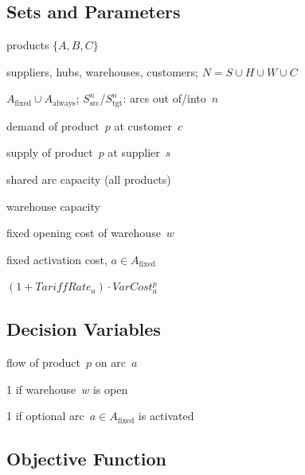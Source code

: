 
\subsection{Sets and Parameters}

\begin{description}[
  labelwidth=3.6em, leftmargin=4em,
  itemsep=1pt, parsep=0pt, topsep=3pt,
  font=\normalfont]
  \item[$P$]             products $\{A, B, C\}$
  \item[$S,H,W,C$]       suppliers, hubs, warehouses, customers; $N=S\cup H\cup W\cup C$
  \item[$A$]             $A_{\text{fixed}}\cup A_{\text{always}}$; $S_{\text{src}}^n$/$S_{\text{tgt}}^n$: arcs out of/into~$n$
  \item[$Dem_c^p$]       demand of product~$p$ at customer~$c$
  \item[$Sup_s^p$]       supply of product~$p$ at supplier~$s$
  \item[$CapArc_a$]      shared arc capacity (all products)
  \item[$CapWare_w$]     warehouse capacity
  \item[$OpenCost_w$]    fixed opening cost of warehouse~$w$
  \item[$FixAct_a$]      fixed activation cost, $a \in A_{\text{fixed}}$
  \item[$TotalCost_a^p$] $(1+TariffRate_a)\cdot VarCost_a^p$
\end{description}

\subsection{Decision Variables}

\begin{description}[
  labelwidth=4.4em, leftmargin=4.8em,
  itemsep=1pt, parsep=0pt, topsep=3pt,
  font=\normalfont]
  \item[$x_a^p \geq 0$]              flow of product~$p$ on arc~$a$
  \item[$y_w \in \{0,1\}$]           1 if warehouse~$w$ is open
  \item[$z_a \in \{0,1\}$]           1 if optional arc~$a \in A_{\text{fixed}}$ is activated
\end{description}

\subsection{Objective Function}

